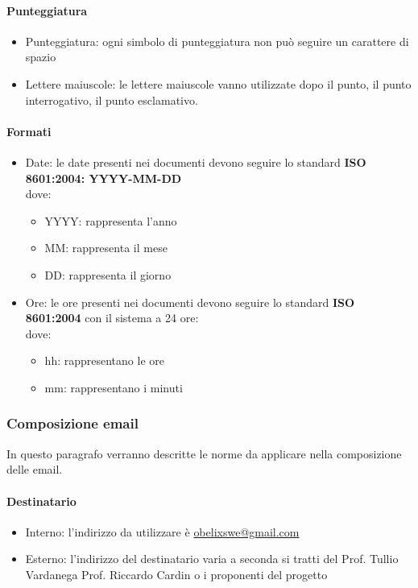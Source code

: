 \paragraph{Punteggiatura}

\begin{itemize}
\item  Punteggiatura: ogni simbolo di punteggiatura non può seguire un carattere di spazio

\item  Lettere maiuscole:  le lettere maiuscole vanno utilizzate dopo
  il punto, il punto interrogativo, il punto esclamativo. 
\end{itemize}

\paragraph{ Formati }
\begin{itemize}
\item Date: le date presenti nei documenti devono seguire lo standard 
\textbf{ISO 8601:2004:  YYYY-MM-DD}\\
  dove:
  \begin{itemize}
  \item YYYY: rappresenta l’anno
  \item MM: rappresenta il mese
  \item DD: rappresenta il giorno
  \end{itemize}

\item Ore: le ore presenti nei documenti devono seguire lo standard 
\textbf{ISO 8601:2004} con il sistema a 24 ore:\\
  dove:
  \begin{itemize}
  \item hh: rappresentano le ore
  \item  mm: rappresentano i minuti
  \end{itemize}
\end{itemize}

\subsubsection{Composizione email}
In questo paragrafo verranno descritte le norme da applicare nella composizione delle email.

\paragraph{Destinatario}
\begin{itemize} 
\item Interno: l’indirizzo da utilizzare è \href{mailto:obelixswe@gmail.com}{obelixswe@gmail.com}
\item Esterno: l’indirizzo del destinatario varia a seconda si tratti del Prof. Tullio Vardanega
  Prof. Riccardo Cardin o i proponenti del progetto
\end{itemize}
